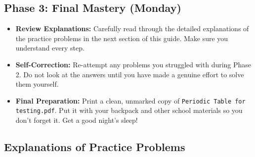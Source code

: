 \documentclass{article}
\begin{document}
\subsection*{Phase 3: Final Mastery (Monday)}
\begin{itemize}[itemsep=5pt]
    \item \textbf{Review Explanations:} Carefully read through the detailed explanations of the practice problems in the next section of this guide. Make sure you understand every step.
    \item \textbf{Self-Correction:} Re-attempt any problems you struggled with during Phase 2. Do not look at the answers until you have made a genuine effort to solve them yourself.
    \item \textbf{Final Preparation:} Print a clean, unmarked copy of \texttt{Periodic Table for testing.pdf}. Put it with your backpack and other school materials so you don't forget it. Get a good night's sleep!
\end{itemize}

\bigskip


\subsection*{Explanations of Practice Problems}
\end{document}
